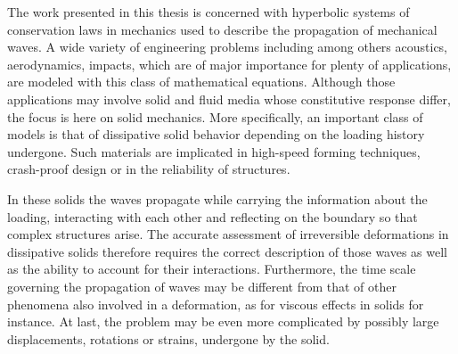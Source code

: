 The work presented in this thesis is concerned with hyperbolic systems of conservation laws in mechanics used to describe the propagation of mechanical waves.
A wide variety of engineering problems including among others acoustics, aerodynamics, impacts, which are of major importance for plenty of applications, are modeled with this class of mathematical equations. 
Although those applications may involve solid and fluid media whose constitutive response differ, the focus is here on solid mechanics.
More specifically, an important class of models is that of dissipative solid behavior depending on the loading history undergone.
Such materials are implicated in high-speed forming techniques, crash-proof design or in the reliability of structures.

In these solids the waves propagate while carrying the information about the loading, interacting with each other and reflecting on the boundary so that complex structures arise.
The accurate assessment of irreversible deformations in dissipative solids therefore requires the correct description of those waves as well as the ability to account for their interactions.
Furthermore, the time scale governing the propagation of waves may be different from that of other phenomena also involved in a deformation, as for viscous effects in solids for instance.
At last, the problem may be even more complicated by possibly large displacements, rotations or strains, undergone by the solid.


